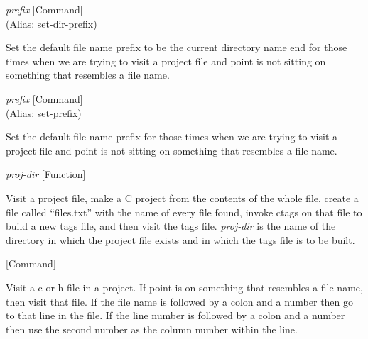 \vspace{1em}
\noindent
{}
\usebox{\funcname}\emph{prefix}
 \hfill [Command]\\%
 (Alias: set-dir-prefix)

\begin{doc-string}
Set the default file name prefix to be the current directory name end for those
times when we are trying to visit a project file and point is not sitting on
something that resembles a file name.
\end{doc-string}

\vspace{1em}
\noindent
{}
\usebox{\funcname}\emph{prefix}
 \hfill [Command]\\%
 (Alias: set-prefix)

\begin{doc-string}
Set the default file name prefix for those times when we are trying to visit
a project file and point is not sitting on something that resembles a file name.
\end{doc-string}

\vspace{1em}
\noindent
{}
\usebox{\funcname}\emph{proj-dir}
 \hfill [Function]

\begin{doc-string}
Visit a project file, make a C project from the contents of the whole file,
create a file called ``files.txt'' with the name of every file found, invoke
ctags on that file to build a new tags file, and then visit the tags file.
\emph{proj-dir} is the name of the directory in which the project file exists and in
which the tags file is to be built.
\end{doc-string}

\vspace{1em}
\noindent
{}
\usebox{\funcname}
 \hfill [Command]

\begin{doc-string}
Visit a c or h file in a project.  If point is on something that resembles a file
name, then visit that file.  If the file name is followed by a colon and a number
then go to that line in the file.  If the line number is followed by a colon and
a number then use the second number as the column number within the line.
\end{doc-string}

